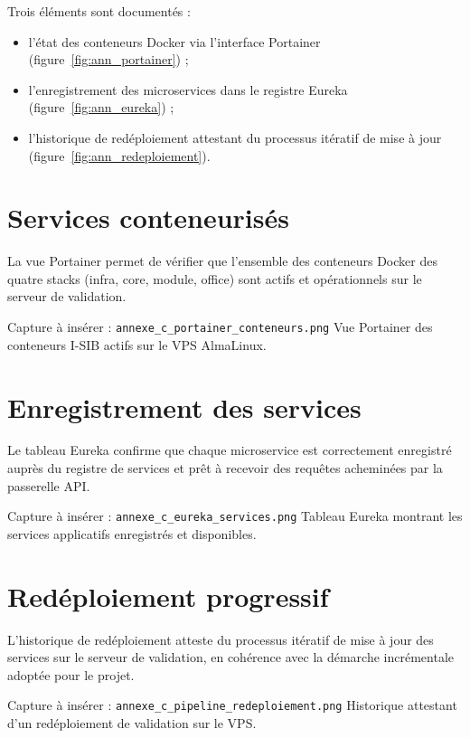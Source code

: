 \documentclass[a4paper,12pt]{report}
\begin{document}
Trois éléments sont documentés :
\begin{itemize}
  \item l'état des conteneurs Docker via l'interface Portainer
        (figure~\ref{fig:ann_portainer}) ;
  \item l'enregistrement des microservices dans le registre Eureka
        (figure~\ref{fig:ann_eureka}) ;
  \item l'historique de redéploiement attestant du processus itératif
        de mise à jour (figure~\ref{fig:ann_redeploiement}).
\end{itemize}

\section{Services conteneurisés}

La vue Portainer permet de vérifier que l'ensemble des conteneurs Docker des
quatre stacks (infra, core, module, office) sont actifs et opérationnels sur
le serveur de validation.

\begin{emplacementcapture}{Capture à insérer : \texttt{annexe\_c\_portainer\_conteneurs.png}}
Vue Portainer des conteneurs I-SIB actifs sur le VPS AlmaLinux.
\end{emplacementcapture}
\label{fig:ann_portainer}

\section{Enregistrement des services}

Le tableau Eureka confirme que chaque microservice est correctement enregistré
auprès du registre de services et prêt à recevoir des requêtes acheminées par
la passerelle API.

\begin{emplacementcapture}{Capture à insérer : \texttt{annexe\_c\_eureka\_services.png}}
Tableau Eureka montrant les services applicatifs enregistrés et disponibles.
\end{emplacementcapture}
\label{fig:ann_eureka}

\section{Redéploiement progressif}

L'historique de redéploiement atteste du processus itératif de mise à jour des
services sur le serveur de validation, en cohérence avec la démarche
incrémentale adoptée pour le projet.

\begin{emplacementcapture}{Capture à insérer : \texttt{annexe\_c\_pipeline\_redeploiement.png}}
Historique attestant d'un redéploiement de validation sur le VPS.
\end{emplacementcapture}
\label{fig:ann_redeploiement}
\end{document}
